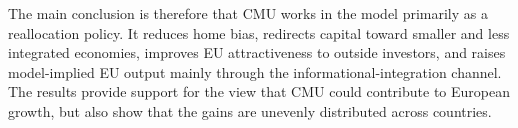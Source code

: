 The main conclusion is therefore that CMU works in the model primarily as a reallocation policy. It reduces home bias, redirects capital toward smaller and less integrated economies, improves EU attractiveness to outside investors, and raises model-implied EU output mainly through the informational-integration channel. The results provide support for the view that CMU could contribute to European growth, but also show that the gains are unevenly distributed across countries.
